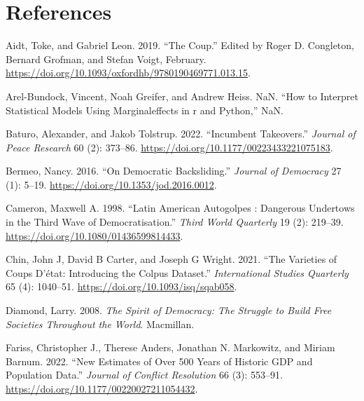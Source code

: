 \documentclass[
  12pt,
]{report}
\newlength{\cslhangindent}
\newenvironment{CSLReferences}[2] %
 {\begin{list}{}{%
  \setlength{\itemindent}{0pt}
  \setlength{\leftmargin}{0pt}
  \setlength{\parsep}{0pt}
  \ifodd #1
   \setlength{\leftmargin}{\cslhangindent}
   \setlength{\itemindent}{-1\cslhangindent}
  \fi
  \setlength{\itemsep}{#2\baselineskip}}}
 {\end{list}}
\begin{document}
\newpage

\chapter*{References}\label{references}

\label{refs}
\begin{CSLReferences}{1}{0}
Aidt, Toke, and Gabriel Leon. 2019. {``The Coup.''} Edited by Roger D.
Congleton, Bernard Grofman, and Stefan Voigt, February.
\url{https://doi.org/10.1093/oxfordhb/9780190469771.013.15}.

Arel-Bundock, Vincent, Noah Greifer, and Andrew Heiss. NaN. {``How to
Interpret Statistical Models Using
{\textbraceleft}Marginaleffects{\textbraceright} in
{\textbraceleft}r{\textbraceright} and
{\textbraceleft}Python{\textbraceright},''} NaN.

Baturo, Alexander, and Jakob Tolstrup. 2022. {``Incumbent Takeovers.''}
\emph{Journal of Peace Research} 60 (2): 373--86.
\url{https://doi.org/10.1177/00223433221075183}.

Bermeo, Nancy. 2016. {``On Democratic Backsliding.''} \emph{Journal of
Democracy} 27 (1): 5--19. \url{https://doi.org/10.1353/jod.2016.0012}.

Cameron, Maxwell A. 1998. {``Latin American Autogolpes : Dangerous
Undertows in the Third Wave of Democratisation.''} \emph{Third World
Quarterly} 19 (2): 219--39.
\url{https://doi.org/10.1080/01436599814433}.

Chin, John J, David B Carter, and Joseph G Wright. 2021. {``The
Varieties of Coups D{'}état: Introducing the Colpus Dataset.''}
\emph{International Studies Quarterly} 65 (4): 1040--51.
\url{https://doi.org/10.1093/isq/sqab058}.

Diamond, Larry. 2008. \emph{The Spirit of Democracy: The Struggle to
Build Free Societies Throughout the World}. Macmillan.

Fariss, Christopher J., Therese Anders, Jonathan N. Markowitz, and
Miriam Barnum. 2022. {``New Estimates of Over 500 Years of Historic GDP
and Population Data.''} \emph{Journal of Conflict Resolution} 66 (3):
553--91. \url{https://doi.org/10.1177/00220027211054432}.


\end{CSLReferences}
\end{document}
